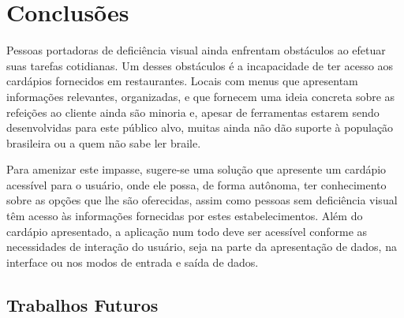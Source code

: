 \chapter{\label{chap:conclu}Conclusões}

Pessoas portadoras de deficiência visual ainda enfrentam obstáculos ao efetuar suas tarefas cotidianas. Um desses obstáculos é a incapacidade de ter acesso aos cardápios fornecidos em restaurantes. Locais com menus que apresentam informações relevantes, organizadas, e que fornecem uma ideia concreta sobre as refeições ao cliente ainda são minoria e, apesar de ferramentas estarem sendo desenvolvidas para este público alvo, muitas ainda não dão suporte à população brasileira ou a quem não sabe ler braile.

Para amenizar este impasse, sugere-se uma solução que apresente um cardápio acessível para o usuário, onde ele possa, de forma autônoma, ter conhecimento sobre as opções que lhe são oferecidas, assim como pessoas sem deficiência visual têm acesso às informações fornecidas por estes estabelecimentos. Além do cardápio apresentado, a aplicação num todo deve ser acessível conforme as necessidades de interação do usuário, seja na parte da apresentação de dados, na interface ou nos modos de entrada e saída de dados.

\section{Trabalhos Futuros}